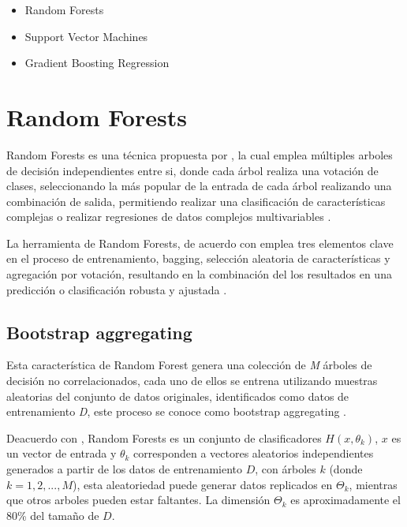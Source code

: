 	\begin{itemize}
		\item Random Forests
		\item Support Vector Machines 
		\item Gradient Boosting Regression
	\end{itemize}
	
	
	
	\section{Random Forests} 
	
		Random Forests es una técnica propuesta por \citet{breiman2001}, la cual emplea múltiples arboles de decisión independientes entre si, donde cada árbol realiza una votación de clases, seleccionando la más popular de la entrada de cada árbol realizando una combinación de salida, permitiendo realizar una clasificación de características complejas o realizar regresiones de datos complejos multivariables \citep{breiman2001, lan2020}.
		
		La herramienta de Random Forests, de acuerdo con \citet{breiman2001} emplea tres elementos clave en el proceso de entrenamiento, bagging, selección aleatoria de características y agregación por votación, resultando en la combinación del los resultados en una predicción o clasificación robusta y ajustada \citep{lan2020}.
		
		\subsection{Bootstrap aggregating}
			
			
			Esta característica de Random Forest genera una colección de \textit{M} árboles de decisión no correlacionados, cada uno de ellos se entrena utilizando muestras aleatorias del conjunto de datos originales, identificados como datos de entrenamiento \textit{D}, este proceso se conoce como bootstrap aggregating \citep{breiman2001}.
			
			Deacuerdo con \citet{breiman2001}, Random Forests es un conjunto de clasificadores $H(x,\theta_{k})$, $x$ es un vector de entrada y $\theta_{k}$ corresponden a vectores aleatorios independientes generados a partir de los datos de entrenamiento $D$, con árboles $k$ (donde $k = 1, 2, ..., M$), esta aleatoriedad puede generar datos replicados en $\Theta_k$, mientras que otros arboles pueden estar faltantes. La dimensión $\Theta_k$ es aproximadamente el 80\% del tamaño de $D$.
			
